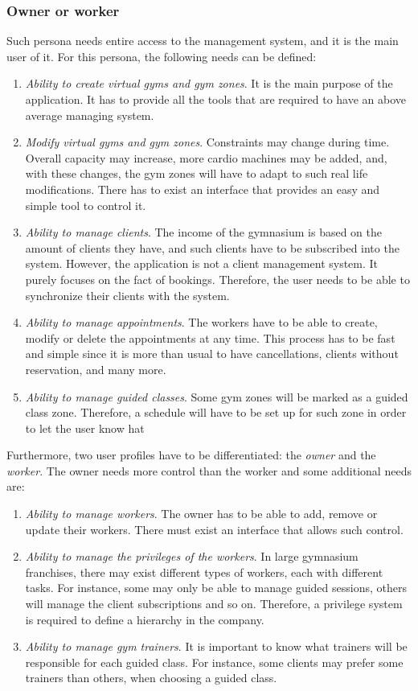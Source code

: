 \documentclass[a4paper, 12pt, oneside]{book}
\begin{document}
\subsubsection{Owner or worker}
Such persona needs entire access to the management system, and it is the main user of it. For this persona, the following needs can be defined:
\begin{enumerate}[label = -]
	\item \emph{Ability to create virtual gyms and gym zones}. It is the main purpose of the application. It has to provide all the tools that are required to have an above average managing system.
	\item \emph{Modify virtual gyms and gym zones}. Constraints may change during time. Overall capacity may increase, more cardio machines may be added, and, with these changes, the gym zones will have to adapt to such real life modifications. There has to exist an interface that provides an easy and simple tool to control it.
	\item \emph{Ability to manage clients}. The income of the gymnasium is based on the amount of clients they have, and such clients have to be subscribed into the system. However, the application is not a client management system. It purely focuses on the fact of bookings. Therefore, the user needs to be able to synchronize their clients with the system.
	\item \emph{Ability to manage appointments}. The workers have to be able to create, modify or delete the appointments at any time. This process has to be fast and simple since it is more than usual to have cancellations, clients without reservation, and many more.
	\item \emph{Ability to manage guided classes}. Some gym zones will be marked as a guided class zone. Therefore, a schedule will have to be set up for such zone in order to let the user know hat
\end{enumerate}
Furthermore, two user profiles have to be differentiated: the \emph{owner} and the \emph{worker}. The owner needs more control than the worker and some additional needs are:
\begin{enumerate}[label = -]
	\item \emph{Ability to manage workers}. The owner has to be able to add, remove or update their workers. There must exist an interface that allows such control.
	\item \emph{Ability to manage the privileges of the workers}. In large gymnasium franchises, there may exist different types of workers, each with different tasks. For instance, some may only be able to manage guided sessions, others will manage the client subscriptions and so on. Therefore, a privilege system is required to define a hierarchy in the company.
	\item \emph{Ability to manage gym trainers}. It is important to know what trainers will be responsible for each guided class. For instance, some clients may prefer some trainers than others, when choosing a guided class.
\end{enumerate}
\end{document}
